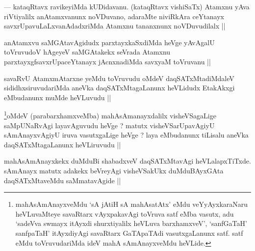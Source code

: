 \begin{artha}
--- kataqRtavx ravikeyiMda kUDidavanu. (kataqRtavx vishiSaTx) Atamxnu yAva riVtiyalilx anAtamxvanunx noVDuvano, adaraMte niviRkAra ceYtanayx savxrUpavuLaLxvanAdadxriMda Atamxnu tananxnunx noVDuvudilalx ||
\end{artha}

\begin{artha}
anAtamxvu saMGAtavAgidudx parxtayxkaSxdiMda heVge yAvAgalU toVruvudoV hAgeyeV saMGAtakekx seVrada Atamxnu parxtayxgfsavxrUpaceYtanayx jAcnxnadiMda savxyaM toVruvanu ||
\end{artha}

\begin{artha}
savaRvU AtamxmAtarxne yeMdu toVruvudu oMdeV daqSATxMtadiMdaleV sididhxsiruvudariMda aneVka daqSATxMtagaLanunx heVLidudx EtakAkxgi eMbudanunx muMde heVLuvudu ||
\end{artha}

\begin{artha}
\footnote[1]{mahAsAmAnayxveMdu `sA jAtiH sA mahAsatAtx' eMdu veYyAyxkaraNaru heVLuvaMteye savaRtarx vAyxpakavAgi toVruva satf eMba vasutx, adu `sadeVva swmayx itAyxdi shurxtiyalilx heVLuva barxhamxveV', `sanfGaTaH' sanfpaTaH' itAyxdiyAgi savaRtarx GaTApaTAdi vasutxgaLanunx satf. satf eMdu toVruvudariMda ideV mahA sAmAnayxveMdu heVLide.}oMdeV (parabarxhamxveMba) mahAsAmanayxdalilx visheVSagaLige saMpUNaRvAgi layavAguvudu heVge ? matutx visheVSarUpavAgiyU sAmAnayxvAgiyU iruva vasutxgaLige heVge ? laya eMbudanunx tiLisalu aneVka daqSATxMtagaLanunx heVLiruvudu ||
\end{artha}

\begin{artha}
mahAsAmAnayxkekx duMduBi shabadxveV daqSATxMtavAgi heVLalapxTiTxde. sAmAnayx matutx adakekx beVreyAgi visheVSakUkx duMduBAyxGAta daqSATxMtaveMdu saMmatavAgide ||
\end{artha}

